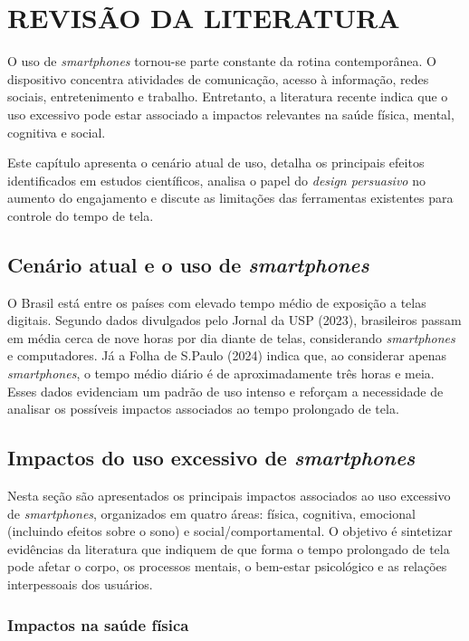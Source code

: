 \chapter{REVISÃO DA LITERATURA}

O uso de \textit{smartphones} tornou-se parte constante da rotina contemporânea. O dispositivo concentra atividades de comunicação, acesso à informação, redes sociais, entretenimento e trabalho. Entretanto, a literatura recente indica que o uso excessivo pode estar associado a impactos relevantes na saúde física, mental, cognitiva e social.

Este capítulo apresenta o cenário atual de uso, detalha os principais efeitos identificados em estudos científicos, analisa o papel do \textit{design persuasivo} no aumento do engajamento e discute as limitações das ferramentas existentes para controle do tempo de tela.

\section{Cenário atual e o uso de \textit{smartphones}}

O Brasil está entre os países com elevado tempo médio de exposição a telas digitais. Segundo dados divulgados pelo Jornal da USP (2023), brasileiros passam em média cerca de nove horas por dia diante de telas, considerando \textit{smartphones} e computadores. Já a Folha de S.Paulo (2024) indica que, ao considerar apenas \textit{smartphones}, o tempo médio diário é de aproximadamente três horas e meia. Esses dados evidenciam um padrão de uso intenso e reforçam a necessidade de analisar os possíveis impactos associados ao tempo prolongado de tela.

\section{Impactos do uso excessivo de \textit{smartphones}}

Nesta seção são apresentados os principais impactos associados ao uso excessivo de \textit{smartphones}, organizados em quatro áreas: física, cognitiva, emocional (incluindo efeitos sobre o sono) e social/comportamental. O objetivo é sintetizar evidências da literatura que indiquem de que forma o tempo prolongado de tela pode afetar o corpo, os processos mentais, o bem-estar psicológico e as relações interpessoais dos usuários.

\subsection{Impactos na saúde física}

